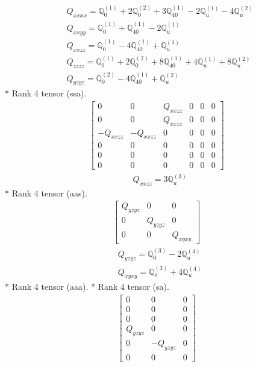 \documentclass[fleqn,8pt,landscape]{jsarticle}
\begin{document}
\begin{align*}
& Q_{xxxx} = \mathbb{Q}_{0}^{(1)} + 2 \mathbb{Q}_{0}^{(2)} + 3 \mathbb{Q}_{40}^{(1)} - 2 \mathbb{Q}_{u}^{(1)} - 4 \mathbb{Q}_{u}^{(2)} \\
& Q_{xxyy} = \mathbb{Q}_{0}^{(1)} + \mathbb{Q}_{40}^{(1)} - 2 \mathbb{Q}_{u}^{(1)} \\
& Q_{xxzz} = \mathbb{Q}_{0}^{(1)} - 4 \mathbb{Q}_{40}^{(1)} + \mathbb{Q}_{u}^{(1)} \\
& Q_{zzzz} = \mathbb{Q}_{0}^{(1)} + 2 \mathbb{Q}_{0}^{(2)} + 8 \mathbb{Q}_{40}^{(1)} + 4 \mathbb{Q}_{u}^{(1)} + 8 \mathbb{Q}_{u}^{(2)} \\
& Q_{yzyz} = \mathbb{Q}_{0}^{(2)} - 4 \mathbb{Q}_{40}^{(1)} + \mathbb{Q}_{u}^{(2)}
\end{align*}
* Rank 4 tensor (ssa).
\begin{align*}
\begin{bmatrix} 0 & 0 & Q_{xxzz} & 0 & 0 & 0 \\ 0 & 0 & Q_{xxzz} & 0 & 0 & 0 \\ - Q_{xxzz} & - Q_{xxzz} & 0 & 0 & 0 & 0 \\ 0 & 0 & 0 & 0 & 0 & 0 \\ 0 & 0 & 0 & 0 & 0 & 0 \\ 0 & 0 & 0 & 0 & 0 & 0 \end{bmatrix}
\end{align*}
\begin{align*}
& Q_{xxzz} = 3 \mathbb{Q}_{u}^{(3)}
\end{align*}
* Rank 4 tensor (aas).
\begin{align*}
\begin{bmatrix} Q_{yzyz} & 0 & 0 \\ 0 & Q_{yzyz} & 0 \\ 0 & 0 & Q_{xyxy} \end{bmatrix}
\end{align*}
\begin{align*}
& Q_{yzyz} = \mathbb{Q}_{0}^{(3)} - 2 \mathbb{Q}_{u}^{(4)} \\
& Q_{xyxy} = \mathbb{Q}_{0}^{(3)} + 4 \mathbb{Q}_{u}^{(4)}
\end{align*}
* Rank 4 tensor (aaa).
* Rank 4 tensor (sa).
\begin{align*}
\begin{bmatrix} 0 & 0 & 0 \\ 0 & 0 & 0 \\ 0 & 0 & 0 \\ Q_{yzyz} & 0 & 0 \\ 0 & - Q_{yzyz} & 0 \\ 0 & 0 & 0 \end{bmatrix}
\end{align*}
\end{document}
